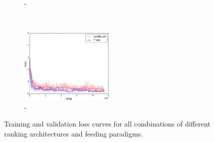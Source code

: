 \begin{figure}[t]
\begin{subfigure}[t]{0.33\textwidth}
        \caption{\label{fig:m3f2}\mthree-\ftwo}
    \end{subfigure}%
    ~
    \begin{subfigure}[t]{0.33\textwidth}
        \centering
        \includegraphics[height=3.6cm]{03-part-02/chapter-04/figs_and_tables/loss_step_plots/step_m3f3.png}
        \caption{\label{fig:m3f3}\mthree-\fthree}
    \end{subfigure}%
    \caption{Training and validation loss curves for all combinations of different ranking architectures and feeding paradigms.}
    \label{fig:step-loss}
\end{figure}
